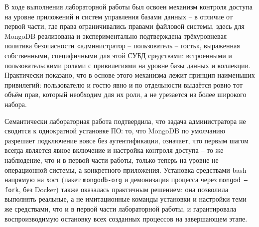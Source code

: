 

В ходе выполнения лабораторной работы был освоен механизм контроля
доступа на уровне приложений и систем управления базами данных -- в
отличие от первой части, где права ограничивались правами файловой
системы, здесь для MongoDB реализована и экспериментально подтверждена
трёхуровневая политика безопасности «администратор -- пользователь --
гость», выраженная собственными, специфичными для этой СУБД средствами:
встроенными и пользовательскими ролями с привилегиями на уровне базы
данных и коллекции. Практически показано, что в основе этого механизма
лежит принцип наименьших привилегий: пользователю и гостю явно и по
отдельности выдаётся ровно тот объём прав, который необходим для их
роли, а не урезается из более широкого набора.

Семантически лабораторная работа подтвердила, что задача администратора
не сводится к однократной установке ПО: то, что MongoDB по умолчанию
разрешает подключение вовсе без аутентификации, означает, что первым
шагом всегда является явное включение и настройка контроля доступа --
то же наблюдение, что и в первой части работы, только теперь на уровне
не операционной системы, а конкретного приложения. Установка средствами
bash напрямую на хост (пакет \texttt{mongodb-org} и демонизация процесса
через \texttt{mongod --fork}, без Docker) также оказалась практичным
решением: она позволила выполнять реальные, а не имитационные команды
установки и настройки теми же средствами, что и в первой части
лабораторной работы, и гарантировала воспроизводимую остановку всех
созданных процессов на завершающем этапе.
